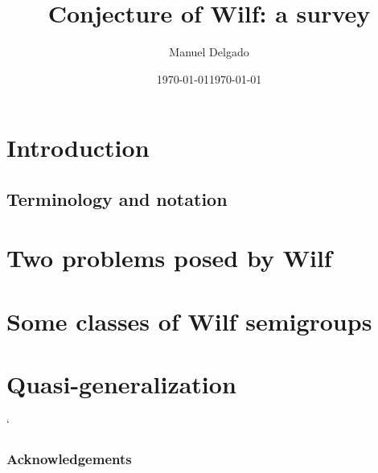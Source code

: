 \documentclass[11pt]{amsart}
\title{Conjecture of Wilf: a survey}
\author{Manuel Delgado}
\date{\today}
\date{\today}
\begin{document}



\maketitle

\begin{abstract}
	
\end{abstract}

\section{Introduction}\label{sec:introduction}

\subsection{Terminology and notation}\label{sec:notation}


\section{Two problems posed by Wilf}\label{sec:problems}

\section{Some classes of Wilf semigroups}\label{sec:particular-cases}

\section{Quasi-generalization}\label{sec:quasi-generalization}


%
%
`%
\subsubsection*{Acknowledgements}\label{sec:acknowledgements}

%
%

\end{document}
